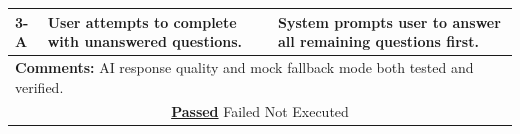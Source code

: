 \documentclass{FastFyp}
\begin{document}
\begin{table}[H]
\begin{tabular}{|p{2.5cm}|p{4cm}|p{2.5cm}|p{4.5cm}|}
3-A & User attempts to complete with unanswered questions. & \multicolumn{2}{p{7cm}|}{System prompts user to answer all remaining questions first.} \\ \hline
\multicolumn{4}{|p{13.5cm}|}{\textbf{Comments:} AI response quality and mock fallback mode both tested and verified.} \\ \hline
\multicolumn{4}{|c|}{\underline{\textbf{Passed}} \quad\quad\quad Failed \quad\quad\quad Not Executed} \\ \hline
\end{tabular}
\end{table}

\vspace{0.5em}

\end{document}
